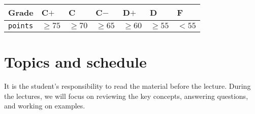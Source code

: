 \documentclass[11pt]{article}
\begin{document}
\begin{center}
\begin{tabular}{lllllll}
\textbf{Grade} & C\(+\) & C & C\(-\) & D\(+\) & D & F\\[0pt]
\hline
\texttt{points} & \(\geq 75\) & \(\geq70\) & \(\geq65\) & \(\geq 60\) & \(\geq 55\) & \(< 55\)\\[0pt]
\end{tabular}
\end{center}

\section{Topics and schedule}
\label{sec:org822d4f7}
It is the student's responsibility to read the material before the lecture.
During the lectures, we will focus on reviewing the key concepts, answering
questions, and working on examples.
\end{document}
